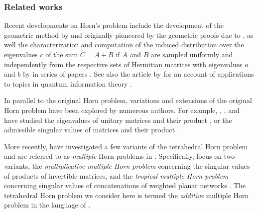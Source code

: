 \documentclass[notitlepage, 11pt, letterpaper]{amsart}
\theoremstyle{plain}
\theoremstyle{definition}
\newcommand{\ea}{a}
\newcommand{\eb}{b}
\newcommand{\ec}{c}
\begin{document}
\subsubsection*{Related works}
Recent developments on Horn's problem include the development of the geometric method by \citeauthor{sherman2015geometric} \cite{sherman2015geometric} and \citeauthor{berline2018horn} \cite{berline2018horn} originally pioneered by the geometric proofs due to \citeauthor{belkale2002geometric} \cite{belkale2002geometric,belkale2005geometric}, as well the characterization and computation of the induced distribution over the eigenvalues $\ec$ of the sum $C=A+B$ if $A$ and $B$ are sampled uniformly and independently from the respective sets of Hermitian matrices with eigenvalues $\ea$ and $\eb$ by \citeauthor{coquereaux2019revisiting} in series of papers \cite{coquereaux2018orbital,coquereaux2018orbital,coquereaux2019revisiting,zuber2018horn}.
See also the article by \citeauthor{daftuar2005quantum} for an account of applications to topics in quantum information theory \cite{daftuar2005quantum}.

In parallel to the original Horn problem, variations and extensions of the original Horn problem have been explored by numerous authors.
For example, \citeauthor{agnihotri1997eigenvalues}, \citeauthor{belkale2008quantum}, and \cite{belkale2016multiplicative} have studied the eigenvalues of unitary matrices and their product \cite{agnihotri1997eigenvalues,belkale2008quantum,belkale2016multiplicative}, or the admissible singular values of matrices and their product \cite{speyer2005horn,thompson1971eigenvaluesviii,klyachko2000random,alekseev2001linearization}.

More recently, \citeauthor{alekseev2025multiple} have investigated a few variants of the tetrahedral Horn problem and are referred to as \textit{multiple} Horn problems in \cite{alekseev2025multiple}.
Specifically, \citeauthor{alekseev2025multiple} focus on two variants, the \textit{multiplicative multiple Horn problem} concerning the singular values of products of invertible matrices, and the \textit{tropical multiple Horn problem} concerning singular values of concatenations of weighted planar networks \cite{alekseev2025multiple}.
The tetrahedral Horn problem we consider here is termed the \textit{additive} multiple Horn problem in the language of \cite{alekseev2025multiple}.
\end{document}
